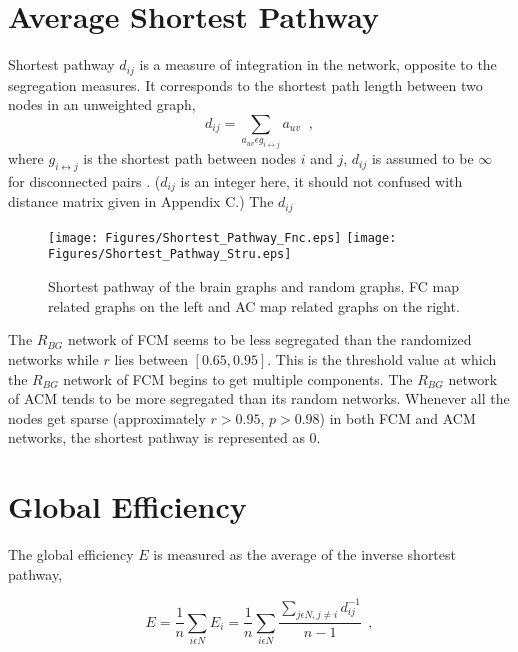 \section{Average Shortest Pathway}
Shortest pathway $d_{ij}$ is a measure of integration in the network, opposite to the segregation measures. It corresponds to the shortest path length between two nodes in an unweighted graph,  
\begin{equation}
d_{ij} = \sum\limits_{a_{uv} \epsilon g_{i\leftrightarrow j} } a_{uv} \;\; ,
\end{equation}
where $g_{i\leftrightarrow j}$ is the shortest path between nodes $i$ and $j$, $d_{ij}$ is assumed to be $\infty$ for disconnected pairs \citep{RUB10}. ($d_{ij}$ is an integer here, it should not confused with distance matrix given in Appendix C.) The $d_{ij}$ 


\begin{figure}[htbp]
 
  \centering
	 \texttt{[image: Figures/Shortest\_Pathway\_Fnc.eps]}
	 \texttt{[image: Figures/Shortest\_Pathway\_Stru.eps]}
  \caption[Shortest Pathway]{Shortest pathway of the brain graphs and random graphs, FC map related graphs on the left and AC map related graphs on the right.} 
    \label{fig:Shortest Pathway}
 	
\end{figure}  


The $R_{BG}$ network of FCM seems to be less segregated than the randomized networks while $r$ lies between $[0.65,0.95]$. This is the threshold value at which the $R_{BG}$ network of FCM begins to get multiple components. The $R_{BG}$ network of ACM tends to be more segregated than its random networks. Whenever all the nodes get sparse (approximately $r>0.95$, $p>0.98$) in both FCM and ACM networks, the shortest pathway is represented as 0. 




\section{Global Efficiency}
The global efficiency $E$ is measured as the average of the inverse shortest pathway,

\begin{equation}
E = \frac{1}{n}\sum\limits_{i \epsilon N} E_i = \frac{1}{n}\sum\limits_{i \epsilon N} \frac{\sum\limits_{j \epsilon N, j\neq i}d_{ij}^{-1}}{n-1 } \;\, ,
\end{equation}

